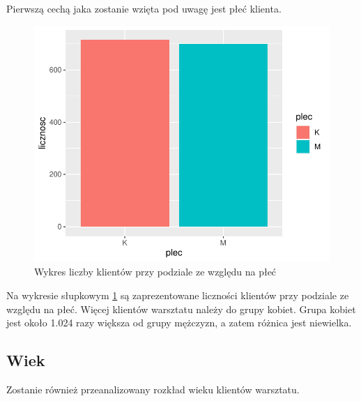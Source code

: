 \documentclass{article}\usepackage[]{graphicx}\usepackage[]{xcolor}
\makeatletter
\def\maxwidth{ %
  \ifdim\Gin@nat@width>\linewidth
    \linewidth
  \else
    \Gin@nat@width
  \fi
}
\newenvironment{knitrout}{}{} %
\makeatother
\begin{document}
Pierwszą cechą jaka zostanie wzięta pod uwagę jest płeć klienta.

\begin{knitrout}
\color{fgcolor}\begin{figure}
\includegraphics[width=\maxwidth]{figure/fig_plec-1} \caption[Wykres liczby klientów przy podziale ze względu na płeć]{Wykres liczby klientów przy podziale ze względu na płeć}\label{fig:fig_plec}
\end{figure}

\end{knitrout}

Na wykresie słupkowym \ref{fig:fig_plec} są zaprezentowane liczności klientów przy podziale ze względu na płeć. Więcej klientów warsztatu należy do grupy kobiet. Grupa kobiet jest około 1.024
razy większa od grupy mężczyzn, a zatem różnica jest niewielka.

\subsection{Wiek}

Zostanie również przeanalizowany rozkład wieku klientów warsztatu.
\end{document}
